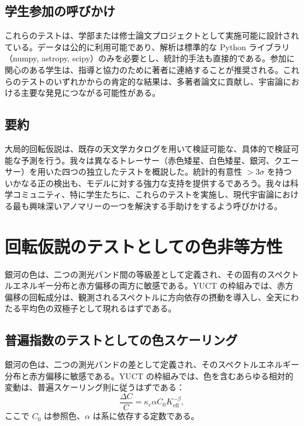 \documentclass[11pt,a4paper]{article}
\begin{document}
	\subsection{学生参加の呼びかけ}
	
	これらのテストは、学部または修士論文プロジェクトとして実施可能に設計されている。データは公的に利用可能であり、解析は標準的な Python ライブラリ（numpy, astropy, scipy）のみを必要とし、統計的手法も直接的である。参加に関心のある学生は、指導と協力のために著者に連絡することが推奨される。これらのテストのいずれかからの肯定的な結果は、多著者論文に貢献し、宇宙論における主要な発見につながる可能性がある。
	
	\subsection{要約}
	
	大局的回転仮説は、既存の天文学カタログを用いて検証可能な、具体的で検証可能な予測を行う。我々は異なるトレーサー（赤色矮星、白色矮星、銀河、クエーサー）を用いた四つの独立したテストを概説した。統計的有意性 \(>3\sigma\) を持ついかなる正の検出も、モデルに対する強力な支持を提供するであろう。我々は科学コミュニティ、特に学生たちに、これらのテストを実施し、現代宇宙論における最も興味深いアノマリーの一つを解決する手助けをするよう呼びかける。
	
	\section{回転仮説のテストとしての色非等方性}
	
	銀河の色は、二つの測光バンド間の等級差として定義され、その固有のスペクトルエネルギー分布と赤方偏移の両方に敏感である。YUCT の枠組みでは、赤方偏移の回転成分は、観測されるスペクトルに方向依存の摂動を導入し、全天にわたる平均色の双極子として現れるはずである。
	
	\subsection{普遍指数のテストとしての色スケーリング}
	
	銀河の色は、二つの測光バンドの差として定義され、そのスペクトルエネルギー分布と赤方偏移に敏感である。YUCT の枠組みでは、色を含むあらゆる相対的変動は、普遍スケーリング則に従うはずである：
	\begin{equation}
		\frac{\Delta C}{C} = \kappa_c \alpha C_0 K_{\mathrm{eff}}^{-\beta},
	\end{equation}
	ここで \(C_0\) は参照色、\(\alpha\) は系に依存する定数である。
	
\end{document}
